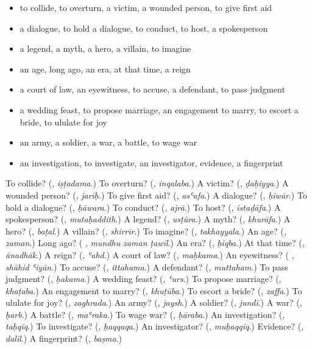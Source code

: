 \begin{itemize}
\raggedright
  \item to collide, to overturn, a victim, a wounded person, to give first aid
  \item a dialogue, to hold a dialogue, to conduct, to host, a spokesperson
  \item a legend, a myth, a hero, a villain, to imagine
  \item an age, long ago, an era, at that time, a reign
  \item a court of law, an eyewitness, to accuse, a defendant, to pass judgment
  \item a wedding feast, to propose marriage, an engagement to marry, to escort a bride, to ululate for joy
  \item an army, a soldier, a war, a battle, to wage war
  \item an investigation, to investigate, an investigator, evidence, a fingerprint
\end{itemize}

\begin{tcolorbox}[breakable,colback=teal!4,colframe=teal!35!black,title={Before you move on}]
To collide? (\textbf{}, \emph{iṣṭadama}.) To overturn? (\textbf{}, \emph{inqalaba}.) A victim? (\textbf{}, \emph{ḍaḥiyya}.) A wounded person? (\textbf{}, \emph{jarīḥ}.) To give first aid? (\textbf{}, \emph{asʿafa}.) A dialogue? (\textbf{}, \emph{ḥiwār}.) To hold a dialogue? (\textbf{}, \emph{ḥāwara}.) To conduct? (\textbf{}, \emph{ajrā}.) To host? (\textbf{}, \emph{istaḍāfa}.) A spokesperson? (\textbf{}, \emph{mutaḥaddith}.) A legend? (\textbf{}, \emph{usṭūra}.) A myth? (\textbf{}, \emph{khurāfa}.) A hero? (\textbf{}, \emph{baṭal}.) A villain? (\textbf{}, \emph{shirrīr}.) To imagine? (\textbf{}, \emph{takhayyala}.) An age? (\textbf{}, \emph{zaman}.) Long ago? (\textbf{  }, \emph{mundhu zaman ṭawīl}.) An era? (\textbf{}, \emph{ḥiqba}.) At that time? (\textbf{}, \emph{ānadhāk}.) A reign? (\textbf{}, \emph{ʿahd}.) A court of law? (\textbf{}, \emph{maḥkama}.) An eyewitness? (\textbf{ }, \emph{shāhid ʿiyān}.) To accuse? (\textbf{}, \emph{ittahama}.) A defendant? (\textbf{}, \emph{muttaham}.) To pass judgment? (\textbf{}, \emph{ḥakama}.) A wedding feast? (\textbf{}, \emph{ʿurs}.) To propose marriage? (\textbf{}, \emph{khaṭaba}.) An engagement to marry? (\textbf{}, \emph{khuṭūba}.) To escort a bride? (\textbf{}, \emph{zaffa}.) To ululate for joy? (\textbf{}, \emph{zaghrada}.) An army? (\textbf{}, \emph{jaysh}.) A soldier? (\textbf{}, \emph{jundī}.) A war? (\textbf{}, \emph{ḥarb}.) A battle? (\textbf{}, \emph{maʿraka}.) To wage war? (\textbf{}, \emph{ḥāraba}.) An investigation? (\textbf{}, \emph{taḥqīq}.) To investigate? (\textbf{}, \emph{ḥaqqaqa}.) An investigator? (\textbf{}, \emph{muḥaqqiq}.) Evidence? (\textbf{}, \emph{dalīl}.) A fingerprint? (\textbf{}, \emph{baṣma}.)
\end{tcolorbox}
